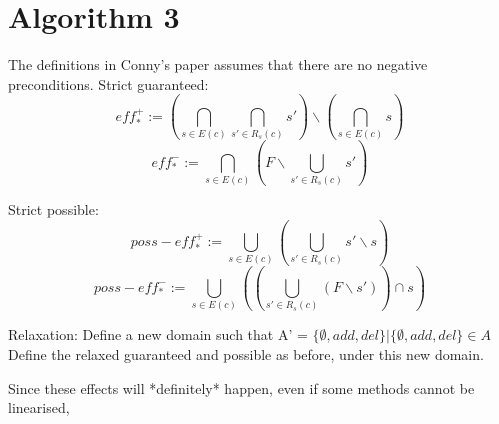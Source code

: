 \section{Algorithm 3}
The definitions in Conny's paper assumes that there are no negative preconditions.
Strict guaranteed:
 $$ eff^{+}_{*} := (\bigcap_{s \in E(c)} \bigcap_{s' \in R_s(c)} s')  \backslash  (\bigcap_{s \in E(c)} s)  $$
 $$ eff^{-}_{*} := \bigcap_{s \in E(c)} (F \backslash \bigcup_{s' \in R_s(c)}  s') $$
 
Strict possible:
 $$ poss-eff^{+}_{*} := \bigcup_{s \in E(c)} (\bigcup_{s' \in R_s(c)} s'\backslash s)   $$
 $$ poss-eff^{-}_{*} := \bigcup_{s \in E(c)} ((\bigcup_{s' \in R_s(c)} ( F \backslash s'))  \cap  s) $$

Relaxation: Define a new domain such that A' = ${ \{\emptyset, add, del \} |  \{\emptyset, add, del \} \in A }$
Define the relaxed guaranteed and possible as before, under this new domain.

Since these effects will *definitely* happen, even if some methods cannot be linearised,


